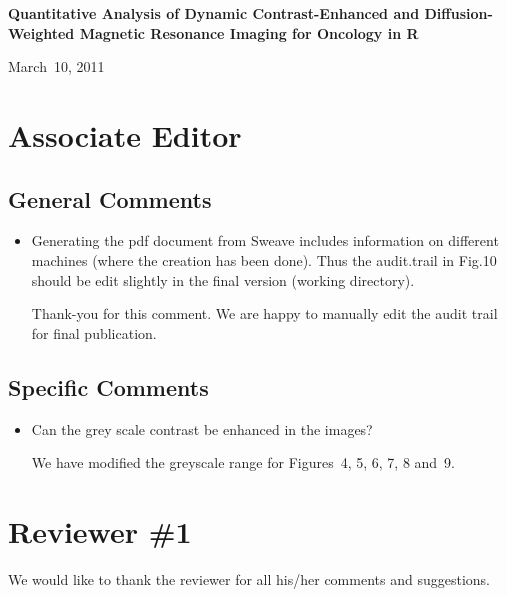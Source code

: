 \documentclass[11pt]{article}
\begin{document}

\begin{center}
{\Large \textbf{Quantitative Analysis of Dynamic Contrast-Enhanced and Diffusion-Weighted Magnetic Resonance Imaging for Oncology in \textsf{R}}}

\bigskip

March~10, 2011

\end{center}

\section*{Associate Editor}

\subsection*{General Comments}

\begin{itemize}

\item Generating the pdf document from Sweave includes information on
  different machines (where the creation has been done).  Thus the
  audit.trail in Fig.10 should be edit slightly in the final version
  (working directory).

  Thank-you for this comment.  We are happy to manually edit the audit
  trail for final publication.

\end{itemize}

\subsection*{Specific Comments}

\begin{itemize}

\item Can the grey scale contrast be enhanced in the images?

  We have modified the greyscale range for Figures~4, 5, 6, 7, 8
  and~9.

\end{itemize}

\section*{Reviewer \#1}

We would like to thank the reviewer for all his/her comments and
suggestions.
\end{document}
